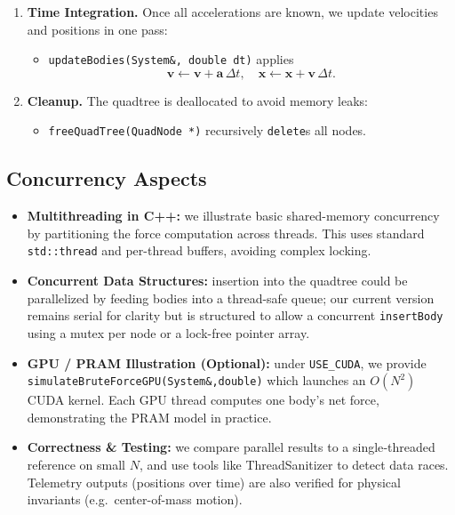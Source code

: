 \documentclass{article}
\begin{document}
\begin{enumerate}
  \item \textbf{Time Integration.}  
    Once all accelerations are known, we update velocities and positions in one pass:
    \begin{itemize}
      \item \texttt{updateBodies(System\&, double dt)} applies
      \[
        \mathbf{v} \gets \mathbf{v} + \mathbf{a}\,\Delta t,\quad
        \mathbf{x} \gets \mathbf{x} + \mathbf{v}\,\Delta t.
      \]
    \end{itemize}

  \item \textbf{Cleanup.}  
    The quadtree is deallocated to avoid memory leaks:
    \begin{itemize}
      \item \texttt{freeQuadTree(QuadNode *)} recursively \texttt{delete}s all nodes.
    \end{itemize}
\end{enumerate}

\subsection*{Concurrency Aspects}

\begin{itemize}
  \item \textbf{Multithreading in C++:} we illustrate basic shared-memory concurrency by partitioning the force computation across threads.  This uses standard \texttt{std::thread} and per-thread buffers, avoiding complex locking.
  \item \textbf{Concurrent Data Structures:} insertion into the quadtree could be parallelized by feeding bodies into a thread-safe queue; our current version remains serial for clarity but is structured to allow a concurrent \texttt{insertBody} using a mutex per node or a lock-free pointer array.
  \item \textbf{GPU / PRAM Illustration (Optional):} under \texttt{USE\_CUDA}, we provide \\ \texttt{simulateBruteForceGPU(System\&,double)} which launches an \(O(N^2)\) CUDA kernel.  Each GPU thread computes one body’s net force, demonstrating the PRAM model in practice.
  \item \textbf{Correctness \& Testing:} we compare parallel results to a single‐threaded reference on small \(N\), and use tools like ThreadSanitizer to detect data races.  Telemetry outputs (positions over time) are also verified for physical invariants (e.g.\ center-of-mass motion).
\end{itemize}
\end{document}
